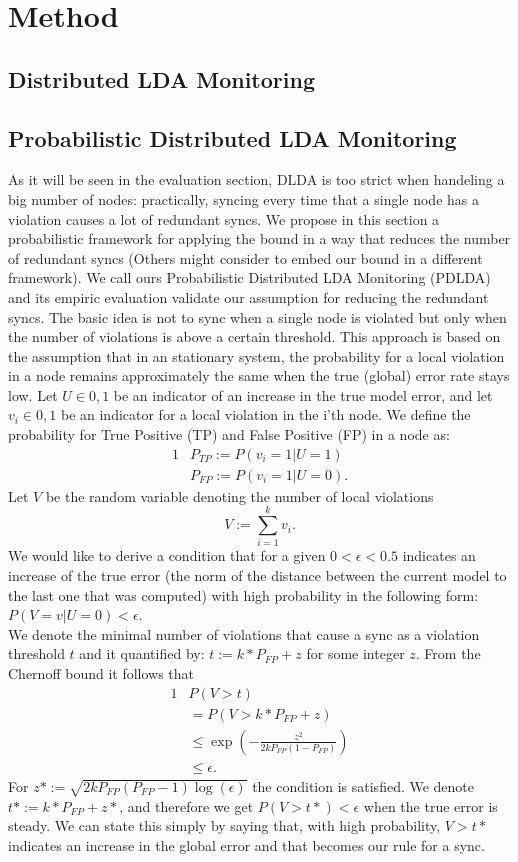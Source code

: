 \documentclass[11pt,twocolumn,varwidth=true,a4paper,fleqn]{article}
\begin{document}
\section{Method}
\subsection{Distributed LDA Monitoring}

\subsection{Probabilistic Distributed LDA Monitoring}
As it will be seen in the evaluation section, DLDA is too strict when handeling
a big number of nodes: practically, syncing every time that a single node
has a violation causes a lot of redundant syncs.
We propose in this section a probabilistic framework for applying the
bound in a way that reduces the number of redundant syncs (Others might consider
to embed our bound in a different framework). 
We call ours Probabilistic Distributed LDA Monitoring (PDLDA) and its
empiric evaluation validate our assumption for reducing the redundant syncs.
The basic idea is not to sync when a single node is violated but only 
when the number of violations is above a certain threshold. 
This approach is based on the assumption that in an stationary system, 
the probability for a local violation in a node remains approximately the same
when the true (global) error rate stays low. 
Let $U \in {0,1}$ be an indicator of an increase in the true model error,
and let $v_i \in {0,1}$ be an indicator for a local violation in the
i'th node. We define the probability for True Positive (TP) and False Positive
(FP) in a node as:
\begin{alignat*}{1}
& P_{TP} := P(v_i=1 | U=1) \\
& P_{FP} := P(v_i=1 | U=0).
\end{alignat*}
Let $V$ be the random variable denoting the number of local violations
\begin{equation*}
V := \sum_{i=1}^k v_i.
\end{equation*}
We would like to derive a condition that for a given $0 < \epsilon < 0.5$
indicates an increase of the true error (the norm of
the distance between the current model to the last one that was computed) 
with high probability in the following form:
$P(V=v|U=0) < \epsilon$.
\\We denote the minimal number of violations that cause a sync as a violation
threshold $t$ and it quantified by: $t:=k*P_{FP}+z$ for some integer $z$.
From the Chernoff bound it follows that 
\begin{alignat*}{1}
& P(V>t) \\
& = P(V>k*P_{FP}+z) \\
& \leq \exp(-\frac{z^2}{2kP_{FP}(1-P_{FP})}) \\
& \leq \epsilon.
\end{alignat*}
For $z*:=\sqrt{2kP_{FP}(P_{FP}-1)\log(\epsilon)}$ the condition is satisfied. 
We denote $t*:=k*P_{FP}+z*$, and therefore we get $P(V > t*) <
\epsilon$ when the true error is steady.
We can state this simply by saying that, with high probability, $V > t*$
indicates an increase in the global error and that becomes our rule for a
sync.
\end{document}
